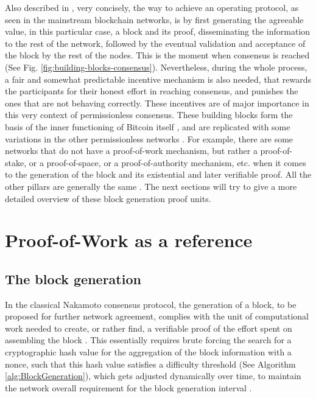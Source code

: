 \documentclass[journal]{IEEEtran}
\begin{document}
Also described in \cite{survey-dist-consensus}, very concisely, the 
way to achieve an operating protocol, as seen in the mainstream blockchain
networks, is by first generating the agreeable value, 
in this particular case, a block and its proof, disseminating the information 
to the rest of the network, followed by the eventual validation and 
acceptance of the block by the rest of the nodes. This is the moment when consensus is reached (See Fig. \ref{fig:building-blocks-consensus}).
Nevertheless, during the whole process, a fair and somewhat predictable incentive mechanism 
is also needed, that rewards the participants for their honest effort in reaching consensus, and
punishes the ones that are not behaving correctly. These incentives are of major importance
in this very context of permissionless consensus. 
These building blocks form the basis of the inner functioning of Bitcoin itself \cite{nakamoto2008bitcoin},
and are replicated with some variations in the other permissionless networks \cite{buterin2014next}.
For example, there are some networks that do not have a proof-of-work mechanism,
but rather a proof-of-stake, or a proof-of-space, or a proof-of-authority mechanism, etc.
when it comes to the generation of the block and its existential and later verifiable proof.
All the other pillars are generally the same \cite{survey-dist-consensus}.
The next sections will try to give a more detailed overview of these 
block generation proof units.

\section{Proof-of-Work as a reference}

\subsection{The block generation}
  
In the classical Nakamoto consensus protocol, the generation of a block, to be proposed
for further network agreement, complies with the unit of computational work needed to
create, or rather find, a verifiable proof of the effort spent on assembling the block \cite{nakamoto2008bitcoin}. 
This essentially requires brute forcing the search for a cryptographic hash value for the
aggregation of the block information with a nonce, such that this hash value satisfies
a difficulty threshold (See Algorithm \ref{alg:BlockGeneration}), which gets adjusted dynamically over time, to maintain the network overall 
requirement for the block generation interval \cite{8629877, survey-dist-consensus}.
\end{document}
